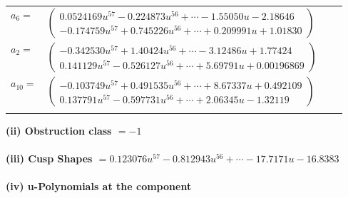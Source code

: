 \documentclass[1p]{elsarticle_modified}
\theoremstyle{definition}
\begin{document}
\begin{tabular}{m{7pt} m{180pt} m{7pt} m{180pt} }
\flushright $a_{6}=$&$\begin{pmatrix}0.0524169 u^{57}-0.224873 u^{56}+\cdots-1.55050 u-2.18646\\-0.174759 u^{57}+0.745226 u^{56}+\cdots+0.209991 u+1.01830\end{pmatrix}$ \\
\flushright $a_{2}=$&$\begin{pmatrix}-0.342530 u^{57}+1.40424 u^{56}+\cdots-3.12486 u+1.77424\\0.141129 u^{57}-0.526127 u^{56}+\cdots+5.69791 u+0.00196869\end{pmatrix}$ \\
\flushright $a_{10}=$&$\begin{pmatrix}-0.103749 u^{57}+0.491535 u^{56}+\cdots+8.67337 u+0.492109\\0.137791 u^{57}-0.597731 u^{56}+\cdots+2.06345 u-1.32119\end{pmatrix}$\\&\end{tabular}
\flushleft \textbf{(ii) Obstruction class $= -1$}\\~\\
\flushleft \textbf{(iii) Cusp Shapes $= 0.123076 u^{57}-0.812943 u^{56}+\cdots-17.7171 u-16.8383$}\\~\\
\newpage\renewcommand{\arraystretch}{1}
\flushleft \textbf{(iv) u-Polynomials at the component}\newline \\
\end{document}

